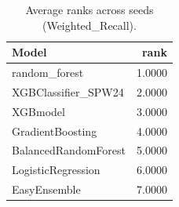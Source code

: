 \begin{table}[t]
\centering
\begin{tabular}{lr}
\toprule
Model & rank \\
\midrule
random_forest & 1.0000 \\
XGBClassifier_SPW24 & 2.0000 \\
XGBmodel & 3.0000 \\
GradientBoosting & 4.0000 \\
BalancedRandomForest & 5.0000 \\
LogisticRegression & 6.0000 \\
EasyEnsemble & 7.0000 \\
\bottomrule
\end{tabular}
\caption{Average ranks across seeds (Weighted_Recall).}
\label{tab:avg_rank_Weighted_Recall}
\end{table}